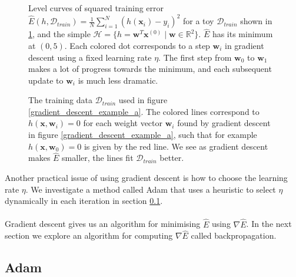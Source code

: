 \begin{figure}
	\hspace{9mm}
	\caption{Level curves of squared training error $\hat{E}(h, \mathcal{D}_{train}) = \frac{1}{N}\sum_{i=1}^N(h(\mathbf{x}_i) - y_i)^2$ for a toy $\mathcal{D}_{train}$ shown in \ref{gradient_descent_example_b}, and the simple $\mathcal{H} = \{h = \mathbf{w}^T\mathbf{x}^{(0)} \mid \mathbf{w} \in \mathbb{R}^2\}$. $\hat{E}$ has its minimum at $(0, 5)$. Each colored dot corresponds to a step $\mathbf{w}_i$ in gradient descent using a fixed learning rate $\eta$. The first step from $\mathbf{w}_0$ to $\mathbf{w}_1$ makes a lot of progress towards the minimum, and each subsequent update to $\mathbf{w}_i$ is much less dramatic.}
	\label{gradient_descent_example_a}
	\vspace{10mm}
	
	\caption{The training data $\mathcal{D}_{train}$ used in figure \ref{gradient_descent_example_a}. The colored lines correspond to $h(\mathbf{x}, \mathbf{w}_i) = 0$ for each weight vector $\mathbf{w}_i$ found by gradient descent in figure \ref{gradient_descent_example_a}, such that for example $h(\mathbf{x}, \mathbf{w}_0) = 0$ is given by the red line. We see as gradient descent makes $\hat{E}$ smaller, the lines fit $\mathcal{D}_{train}$ better.}
	\label{gradient_descent_example_b}
\end{figure}
\noindent
Another practical issue of using gradient descent is how to choose the learning rate $\eta$. We investigate a method called Adam that uses a heuristic to select $\eta$ dynamically in each iteration in section \ref{adam}.
\\\\
Gradient descent gives us an algorithm for minimising $\hat{E}$ using $\nabla\hat{E}$. In the next section we explore an algorithm for computing $\nabla\hat{E}$ called backpropagation.

\subsection{Adam}
\label{adam}

